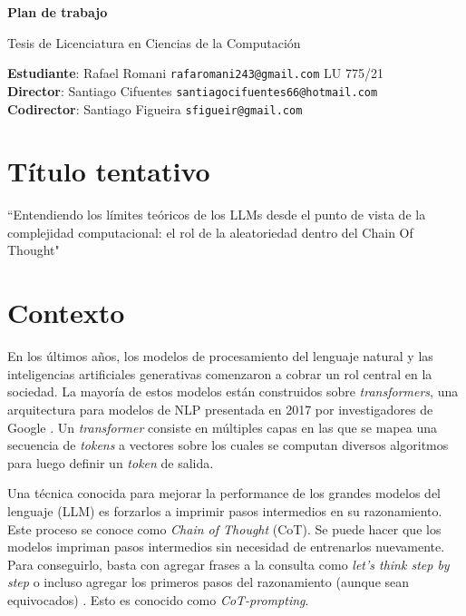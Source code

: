 \documentclass[a4paper,8pt]{article} %
\begin{document}
\thispagestyle{empty} %

\begin{center}

{\huge \textbf{Plan de trabajo}}

\vspace{0.2cm}
{\large Tesis de Licenciatura en Ciencias de la Computación}
\end{center}
\vspace{-0.1em}
\noindent
\vspace{-0.1em}\textbf{Estudiante}: Rafael Romani \quad \texttt{rafaromani243@gmail.com} \quad LU 775/21 \\
\vspace{-0.1em}\textbf{Director}: Santiago Cifuentes \quad \texttt{santiagocifuentes66@hotmail.com} \\
\vspace{-0.1em}\textbf{Codirector}: Santiago Figueira \quad \texttt{sfigueir@gmail.com}

\section*{\Large Título tentativo}
\noindent “Entendiendo los límites teóricos de los LLMs desde el punto de vista de la complejidad computacional: el rol de la aleatoriedad dentro del Chain Of Thought"

\section*{\Large Contexto}

En los últimos años, los modelos de procesamiento del lenguaje natural y las inteligencias artificiales generativas comenzaron a cobrar un rol central en la sociedad.
La mayoría de estos modelos están construidos sobre \textit{transformers}, una arquitectura para modelos de NLP presentada en 2017 por investigadores de Google \cite{ATTN-all-you-need}.
Un \textit{transformer} consiste en múltiples capas en las que se mapea una secuencia de \textit{tokens} a vectores sobre los cuales se computan diversos algoritmos para luego definir un \textit{token} de salida.

Una técnica conocida para mejorar la performance de los grandes modelos del lenguaje (LLM) es forzarlos a imprimir pasos intermedios en su razonamiento.
Este proceso se conoce como \textit{Chain of Thought} (CoT).
Se puede hacer que los modelos impriman pasos intermedios sin necesidad de entrenarlos nuevamente. 
Para conseguirlo, basta con agregar frases a la consulta como \textit{let's think step by step} o incluso agregar los primeros pasos del razonamiento (aunque sean equivocados) \cite{wang-etal-2023-towards} \cite{cot-prompt}.
Esto es conocido como \textit{CoT-prompting}.
\end{document}
